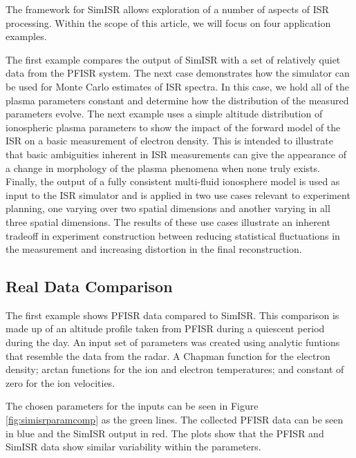 The framework for SimISR allows exploration of a number of aspects of ISR processing. Within the scope of this article, we will focus on four application examples.

The first example compares the output of SimISR with a set of relatively quiet data from the PFISR system. The next case demonstrates how the simulator can be used for Monte Carlo estimates of ISR spectra. In this case, we hold all of the plasma parameters constant and determine how the distribution of the measured parameters evolve. The next example uses a simple altitude distribution of ionospheric plasma parameters to show the impact of the forward model of the ISR on a basic measurement of electron density. This is intended to illustrate that basic ambiguities inherent in ISR measurements can give the appearance of a change in morphology of the plasma phenomena when none truly exists. Finally, the output of a fully consistent multi-fluid ionosphere model is used as input to the ISR simulator and is applied in two use cases relevant to experiment planning, one varying over two spatial dimensions and another varying in all three spatial dimensions. The results of these use cases illustrate an inherent tradeoff in experiment construction between reducing statistical fluctuations in the measurement and increasing distortion in the final reconstruction. 

\subsection{Real Data Comparison}

The first example shows PFISR data compared to SimISR. This comparison is made up of an altitude profile taken from PFISR during a quiescent period during the day. An input set of parameters was created using analytic funtions that resemble the data from the radar. A Chapman function for the electron density; arctan functions for the ion and electron temperatures; and constant of zero for the ion velocities.

The chosen parameters for the inputs can be seen in Figure \ref{fig:simisrparamcomp} as the green lines. The collected PFISR data can be seen in blue and the SimISR output in red. The plots show that the PFISR and SimISR data show similar variability within the parameters.


